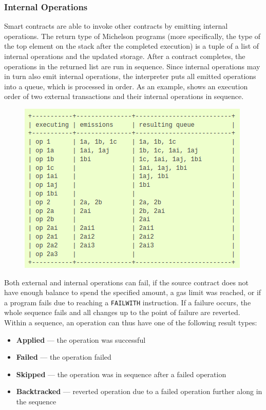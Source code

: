 \subsubsection{Internal Operations}\label{sec:internal_ops}
Smart contracts are able to invoke other contracts by emitting internal operations. The return type of Michelson programs (more specifically, the type of the top element on the stack after the completed execution) is a tuple of a list of internal operations and the updated storage. After a contract completes, the operations in the returned list are run in sequence. Since internal operations may in turn also emit internal operations, the interpreter puts all emitted operations into a queue, which is processed in order. As an example,  shows an execution order of two external transactions and their internal operations in sequence.
\begin{figure}[h]
\centering
\includegraphics[width=0.5\linewidth]{figures/5-offline_tezos/internal_ops}
\label{fig:internal_ops}
\end{figure}

Both external and internal operations can fail, if the source contract does not have enough balance to spend the specified amount, a gas limit was reached, or if a program fails due to reaching a \texttt{FAILWITH} instruction. If a failure occurs, the whole sequence fails and all changes up to the point of failure are reverted. Within a sequence, an operation can thus have one of the following result types:
\begin{itemize}
\item \textbf{Applied} --- the operation was successful
\item \textbf{Failed} --- the operation failed
\item \textbf{Skipped} --- the operation was in sequence after a failed operation
\item \textbf{Backtracked} --- reverted operation due to a failed operation further along in the sequence
\end{itemize}

